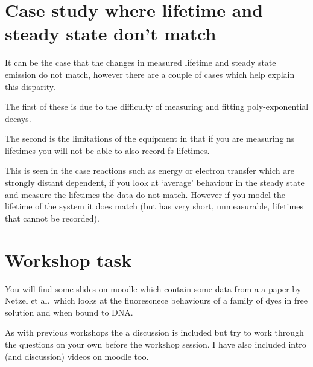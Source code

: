\documentclass[
]{book}
\begin{document}
\hypertarget{case-study-where-lifetime-and-steady-state-dont-match}{%
\section{Case study where lifetime and steady state don't match}\label{case-study-where-lifetime-and-steady-state-dont-match}}

It can be the case that the changes in measured lifetime and steady state emission do not match, however there are a couple of cases which help explain this disparity.

The first of these is due to the difficulty of measuring and fitting poly-exponential decays.

The second is the limitations of the equipment in that if you are measuring ns lifetimes you will not be able to also record fs lifetimes.

This is seen in the case reactions such as energy or electron transfer which are strongly distant dependent, if you look at `average' behaviour in the steady state and measure the lifetimes the data do not match. However if you model the lifetime of the system it does match (but has very short, unmeasurable, lifetimes that cannot be recorded).

\hypertarget{workshop-task-2}{%
\section{Workshop task}\label{workshop-task-2}}

You will find some slides on moodle which contain some data from a a paper by Netzel et al.~which looks at the fluorescnece behaviours of a family of dyes in free solution and when bound to DNA.

As with previous workshops the a discussion is included but try to work through the questions on your own before the workshop session. I have also included intro (and discussion) videos on moodle too.

  
\end{document}
